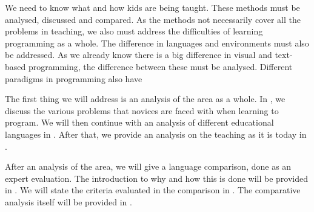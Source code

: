 We need to know what and how kids are being taught. These methods must be analysed, discussed and compared. As the methods not necessarily cover all the problems in teaching, we also must address the difficulties of learning programming as a whole. The difference in languages and environments must also be addressed. As we already know there is a big difference in visual and text-based programming, the difference between these must be analysed. Different paradigms in programming also have 

The first thing we will address is an analysis of the area as a whole. In , we discuss the various problems that novices are faced with when learning to program. We will then continue with an analysis of different educational languages in . After that, we provide an analysis on the teaching as it is today in .

After an analysis of the area, we will give a language comparison, done as an expert evaluation. The introduction to why and how this is done will be provided in . We will state the criteria evaluated in the comparison in . The comparative analysis itself will be provided in . 





